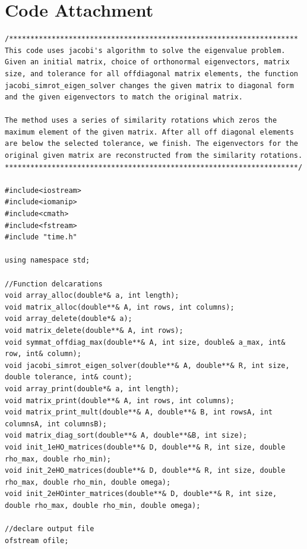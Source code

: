 \documentclass[11pt,a4paper]{article}
\begin{document}
{\newpage

\section*{Code Attachment}

\begin{lstlisting}[title={eigensolver.cpp}]
/********************************************************************
This code uses jacobi's algorithm to solve the eigenvalue problem.
Given an initial matrix, choice of orthonormal eigenvectors, matrix 
size, and tolerance for all offdiagonal matrix elements, the function 
jacobi_simrot_eigen_solver changes the given matrix to diagonal form
and the given eigenvectors to match the original matrix. 

The method uses a series of similarity rotations which zeros the
maximum element of the given matrix. After all off diagonal elements
are below the selected tolerance, we finish. The eigenvectors for the
original given matrix are reconstructed from the similarity rotations.
*********************************************************************/

#include<iostream>
#include<iomanip>
#include<cmath>
#include<fstream>
#include "time.h"

using namespace std;

//Function delcarations
void array_alloc(double*& a, int length);
void matrix_alloc(double**& A, int rows, int columns);
void array_delete(double*& a);
void matrix_delete(double**& A, int rows);
void symmat_offdiag_max(double**& A, int size, double& a_max, int& row, int& column);
void jacobi_simrot_eigen_solver(double**& A, double**& R, int size, double tolerance, int& count);
void array_print(double*& a, int length);
void matrix_print(double**& A, int rows, int columns);
void matrix_print_mult(double**& A, double**& B, int rowsA, int columnsA, int columnsB);
void matrix_diag_sort(double**& A, double**&B, int size);
void init_1eHO_matrices(double**& D, double**& R, int size, double rho_max, double rho_min);
void init_2eHO_matrices(double**& D, double**& R, int size, double rho_max, double rho_min, double omega);
void init_2eHOinter_matrices(double**& D, double**& R, int size, double rho_max, double rho_min, double omega);

//declare output file
ofstream ofile;


\end{lstlisting}}
\end{document}
